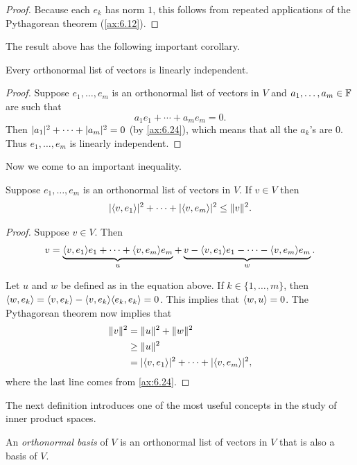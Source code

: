 \begin{proof}
Because each $e_k$ has norm $1$, this follows from repeated applications of the
Pythagorean theorem (\ref{ax:6.12}).
\end{proof}

The result above has the following important corollary.

\begin{result}\label{ax:6.25}
Every orthonormal list of vectors is linearly independent.
\end{result}

\begin{proof}
Suppose $e_1,\dots,e_m$ is an orthonormal list of vectors in $V$ and
$a_1,\dots,a_m\in\mathbb{F}$ are such that
\[ a_1e_1+\cdots+a_me_m = 0. \]
Then $\lvert a_1 \rvert^2+\cdots+\lvert a_m \rvert^2=0$ (by \ref{ax:6.24}), which means that all
the $a_k$'s are $0$. Thus $e_1,\dots,e_m$ is linearly independent.
\end{proof}

Now we come to an important inequality.

\begin{result}\label{ax:6.26}
Suppose $e_1,\dots,e_m$ is an orthonormal list of vectors in $V$. If $v\in V$
then
\[ \lvert \langle v, e_1 \rangle \rvert^2+\cdots+\lvert \langle v, e_m \rangle \rvert^2 \le \lVert v \rVert^2. \]
\end{result}

\begin{proof}
Suppose $v\in V$. Then
\[ v = \underbrace{\langle v, e_1 \rangle e_1+\cdots+\langle v, e_m \rangle e_m}_{u}
     + \underbrace{v-\langle v, e_1 \rangle e_1-\cdots-\langle v, e_m \rangle e_m}_{w}. \]

Let $u$ and $w$ be defined as in the equation above. If $k\in\{1,\dots,m\}$, then
$\langle w, e_k \rangle=\langle v, e_k \rangle-\langle v, e_k \rangle\langle e_k, e_k \rangle=0$. This implies that
$\langle w, u \rangle=0$. The Pythagorean theorem now implies that
\begin{align*}
\lVert v \rVert^2 &= \lVert u \rVert^2+\lVert w \rVert^2\\
           &\ge \lVert u \rVert^2\\
           &= \lvert \langle v, e_1 \rangle \rvert^2+\cdots+\lvert \langle v, e_m \rangle \rvert^2,
\end{align*}
where the last line comes from \ref{ax:6.24}.
\end{proof}

The next definition introduces one of the most useful concepts in the study of
inner product spaces.

\begin{definition}\label{ax:6.27}
An \emph{orthonormal basis} of $V$ is an orthonormal list of vectors in $V$ that
is also a basis of $V$.
\end{definition}

